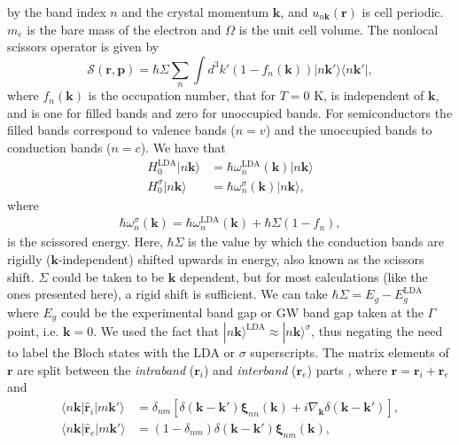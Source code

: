 by the band index $n$ and the crystal momentum $\mathbf{k}$, and $u_{n\mathbf{k}}(\mathbf{r})$
is cell periodic. $m_{e}$ is the bare mass of the electron and $\Omega$ is the 
unit cell volume. The nonlocal scissors operator is given by 
\begin{equation}\label{chon.0}
\mathcal{S}(\mathbf{r},\mathbf{p}) = \hbar\Sigma\sum_{n}\int d^{3}k'(1-f_{n}(\mathbf{k})) |n\mathbf{k}'\rangle \langle n\mathbf{k}'|
,
\end{equation}
where $f_{n}(\mathbf{k})$ is the occupation number, that for $T = 0$ K, is
independent of $\mathbf{k}$, and is one for filled bands and zero for
unoccupied bands. For semiconductors the filled bands correspond to
valence
bands ($n = v$) and the unoccupied bands to conduction bands ($n = c$). 
We have that
\begin{equation}\label{chon.1}
\begin{split}
H^\mathrm{LDA}_{0} |n\mathbf{k}\rangle
&= \hbar\omega^{\mathrm{LDA}}_{n}(\mathbf{k}) |n\mathbf{k}\rangle\\
H^{\sigma}_{0} |n\mathbf{k}\rangle
&= \hbar\omega^{\sigma}_{n}(\mathbf{k}) |n\mathbf{k}\rangle
,
\end{split}
\end{equation} 
where 
\begin{align}\label{chon.78}
\hbar\omega^{\sigma}_{n}(\mathbf{k})=\hbar\omega^{\mathrm{LDA}}_{n}(\mathbf{k})+\hbar\Sigma(1 - f_{n})
,
\end{align}
is the
 scissored
energy. Here, 
$\hbar\Sigma$ is the value by which the conduction bands are rigidly
($\mathbf{k}$-independent)
 shifted
upwards in energy, also known as the scissors shift. $\Sigma$ could be taken to be
$\mathbf{k}$ dependent, but for most calculations (like the ones presented
here), a rigid shift is sufficient. We can take 
$\hbar\Sigma=E_g-E_g^\mathrm{LDA}$ where $E_g$ could be the experimental band gap 
or GW band gap taken at the $\Gamma$ point, i.e. $\mathbf{k}=0$.
We used the fact that 
$|n\mathbf{k}\rangle^\mathrm{LDA} \approx |n\mathbf{k}\rangle^\sigma$, thus negating the need to label
the Bloch states with the LDA or $\sigma$ superscripts. 
The matrix elements of $\mathbf{r}$ are split between the \emph{intraband} 
($\mathbf{r}_i$) and \emph{interband} ($\mathbf{r}_{e}$) parts , where 
$\mathbf{r} = \mathbf{r}_{i} + \mathbf{r}_{e}$ and \cite{adamsJCP53,blountSSP62,aversaPRB95}
\begin{align}\label{rnminn}
\langle n\mathbf{k}| \hat{\mathbf{r}}_{i} |m\mathbf{k}'\rangle 
&= \delta_{nm}
\left[
  \delta(\mathbf{k} - \mathbf{k}')\boldsymbol{\xi}_{nn}(\mathbf{k})
+ i\nabla_{\mathbf{k}}\delta(\mathbf{k} - \mathbf{k}')
\right],\\
\langle n\mathbf{k}| \hat{\mathbf{r}}_{e} |m\mathbf{k}'\rangle 
&= (1- \delta_{nm})\delta(\mathbf{k}-\mathbf{k}')
   \boldsymbol{\xi}_{nm}(\mathbf{k}),\label{rnmenn}
\end{align}
